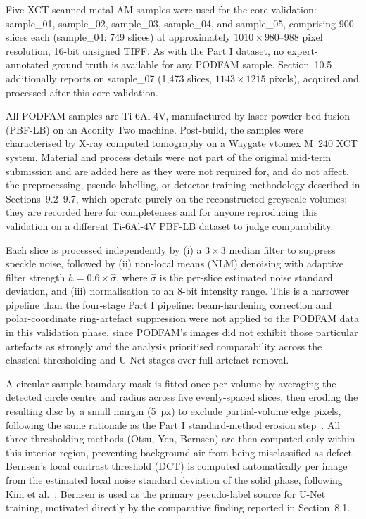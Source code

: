 
Five XCT-scanned metal AM samples were used for the core validation: sample\_01, sample\_02,
sample\_03, sample\_04, and sample\_05, comprising 900 slices each (sample\_04: 749 slices) at
approximately $1010\times980$--988 pixel resolution, 16-bit unsigned TIFF. As with the Part I
dataset, no expert-annotated ground truth is available for any PODFAM sample. Section~10.5
additionally reports on sample\_07 (1,473 slices, $1143\times1215$ pixels), acquired and processed
after this core validation.

All PODFAM samples are Ti-6Al-4V, manufactured by laser powder bed fusion (PBF-LB) on an Aconity Two
machine. Post-build, the samples were characterised by X-ray computed tomography on a Waygate
v\textbar tome\textbar x M~240 XCT system. Material and process details were not part of the original
mid-term submission and are added here as they were not required for, and do not affect, the
preprocessing, pseudo-labelling, or detector-training methodology described in Sections~9.2--9.7,
which operate purely on the reconstructed greyscale volumes; they are recorded here for completeness
and for anyone reproducing this validation on a different Ti-6Al-4V PBF-LB dataset to judge
comparability.

Each slice is processed independently by (i) a $3\times3$ median filter to suppress speckle noise,
followed by (ii) non-local means (NLM) denoising with adaptive filter strength
$h = 0.6 \times \hat{\sigma}$, where $\hat{\sigma}$ is the per-slice estimated noise standard
deviation, and (iii) normalisation to an 8-bit intensity range. This is a narrower pipeline than the
four-stage Part I pipeline: beam-hardening correction and polar-coordinate ring-artefact suppression
were not applied to the PODFAM data in this validation phase, since PODFAM's images did not exhibit
those particular artefacts as strongly and the analysis prioritised comparability across the
classical-thresholding and U-Net stages over full artefact removal.

A circular sample-boundary mask is fitted once per volume by averaging the detected circle centre and
radius across five evenly-spaced slices, then eroding the resulting disc by a small margin (5~px) to
exclude partial-volume edge pixels, following the same rationale as the Part I standard-method
erosion step~\citep{NIST_Standard}. All three thresholding methods (Otsu, Yen, Bernsen) are then
computed only within this interior region, preventing background air from being misclassified as
defect. Bernsen's local contrast threshold (DCT) is computed automatically per image from the
estimated local noise standard deviation of the solid phase, following Kim et
al.~\citep{Kim2017}; Bernsen is used as the primary pseudo-label source for U-Net training, motivated
directly by the comparative finding reported in Section~8.1.

